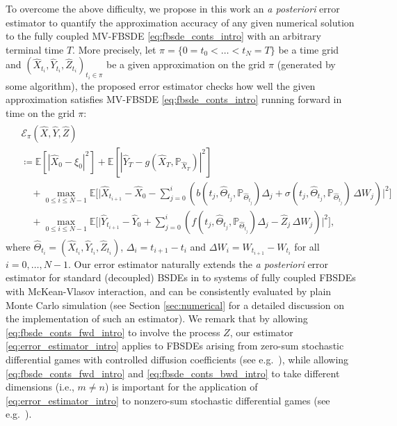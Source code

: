 \documentclass[11pt]{article}
\numberwithin{equation}{section}
\theoremstyle{definition}
\theoremstyle{remark}
\def\l{\label}  \def\f{\frac}  \def\fa{\forall}
\def\cE{\mathcal{E}}
\def\sE{{\mathbb{E}}}
\def\sP{\mathbb{P}}
\begin{document}
To overcome the above difficulty,
we propose  in this work an \textit{a posteriori} error estimator to quantify the approximation accuracy 
of any given numerical solution
to the fully coupled MV-FBSDE \eqref{eq:fbsde_conts_intro} with an arbitrary terminal time $T$.
More precisely, let $\pi=\{0=t_0<\ldots <t_N=T\}$ be a    time grid 
and $(\hat{X}_{t_i},\hat{Y}_{t_i},\hat{Z}_{t_i})_{t_i\in \pi}$ 
be a  given approximation  on the grid $\pi$ (generated by some algorithm),
the proposed  error estimator checks how well the given approximation  satisfies  MV-FBSDE \eqref{eq:fbsde_conts_intro}
running forward in time on the grid $\pi$:
\begin{align}\l{eq:error_estimator_intro}
\begin{split}
&\cE_\pi(\hat{X},\hat{Y},\hat{Z})
\\
&\coloneqq
\sE[|\hat{X}_0-\xi_0|^2]
+
\sE[|\hat{Y}_T-g(\hat{X}_T,\sP_{\hat{X}_T})|^2]
\\
&\quad +
\max_{0\le i\le N-1}
\sE
\bigg[
\bigg|
\hat{X}_{t_{i+1}}
-\hat{X}_{0}
-\sum_{j=0}^i
\left(
b(t_j,\hat{\Theta}_{t_j},\sP_{\hat{\Theta}_{t_j}})\Delta_j  +
\sigma (t_j,\hat{\Theta}_{t_j},\sP_{\hat{\Theta}_{t_j}})\, \Delta W_j
\right)
\bigg|^2
\bigg]\\
&\quad +
\max_{0\le i\le N-1}
\sE\bigg[
\bigg|
\hat{Y}_{t_{i+1}}-\hat{Y}_0
+\sum_{j=0}^{i}
\left(
f(t_{j},\hat{\Theta}_{t_j}, \sP_{\hat{\Theta}_{t_j}})\Delta_j- \hat{Z}_j\,\Delta W_j
\right)
\bigg|^2
\bigg],
\end{split}
\end{align}
where
$\hat{\Theta}_{t_i}=(\hat{X}_{t_i},\hat{Y}_{t_i},\hat{Z}_{t_i})$,
 $\Delta_i=t_{i+1}-t_i$ and $\Delta W_i=W_{t_{i+1}}-W_{t_i}$ for all $i=0,\ldots,N-1$.
Our error estimator  naturally extends  the  \textit{a posteriori} error estimator for 
 standard (decoupled)
 BSDEs in \cite{bender2013}
to  systems of fully coupled FBSDEs with McKean-Vlasov interaction,
and can be consistently evaluated by
plain Monte Carlo simulation
{(see Section \ref{sec:numerical} for a detailed discussion
on the implementation of such an estimator)}. %
We remark that 
by allowing \eqref{eq:fbsde_conts_fwd_intro} to involve the process $Z$,
our estimator \eqref{eq:error_estimator_intro} applies to  FBSDEs arising from 
zero-sum stochastic
differential games with controlled diffusion coefficients (see e.g.~\cite{peng1999}),
while allowing 
 \eqref{eq:fbsde_conts_fwd_intro} and  \eqref{eq:fbsde_conts_bwd_intro} to take different dimensions 
 (i.e., $m\not =n$)
 is important for the application of \eqref{eq:error_estimator_intro} 
 to nonzero-sum stochastic
differential games (see e.g.~\cite{hamadene1999}).
 
\end{document}
